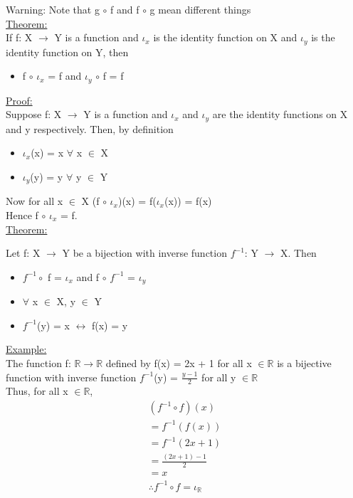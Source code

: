 \documentclass{article}
\begin{document}
Warning: Note that g $\circ$ f and f $\circ$ g mean different things \\

\underline{Theorem:} \\
If f: X $\longrightarrow$ Y is a function and $\iota_{x}$ is the identity function on X and $\iota_{y}$ is the identity function on Y, then
\begin{itemize}
\item f $\circ$ $\iota_{x}$ = f and $\iota_{y}$ $\circ$ f = f
\end{itemize}

\underline{Proof:} \\
Suppose f: X $\longrightarrow$ Y is a function and $\iota_{x}$ and $\iota_{y}$ are the identity functions on X and y respectively. Then, by definition
\begin{itemize}
\item $\iota_{x}$(x) = x $\forall$ x $\in$ X
\item $\iota_{y}$(y) = y $\forall$ y $\in$ Y
\end{itemize}

Now for all x $\in$ X (f $\circ$ $\iota_{x}$)(x) = f($\iota_{x}$(x)) = f(x) \\
Hence f $\circ$ $\iota_{x}$ = f. \\

\underline{Theorem:}

Let f: X $\longrightarrow$ Y be a bijection with inverse function $f^{-1}$: Y $\longrightarrow$ X. Then 
\begin{itemize}
\item $f^{-1} \circ$ f = $\iota_{x}$ and f $\circ$ $f^{-1}$ = $\iota_{y}$
\item $\forall$ x $\in$ X, y $\in$ Y
\item $f^{-1}$(y) = x $\leftrightarrow$ f(x) = y
\end{itemize} 

\underline{Example:} \\

The function f: $\mathbb{R} \longrightarrow \mathbb{R}$ defined by f(x) = 2x + 1 for all x $\in \mathbb{R}$ is a bijective function with inverse function $f^{-1}$(y) = $\frac{y-1}{2}$ for all y $\in \mathbb{R}$ \\

Thus, for all x $\in \mathbb{R}$, \\

\begin{align}
(f^{-1} \circ f)(x) \\
= f^{-1}(f(x)) \\
= f^{-1}(2x + 1)\\
= \frac{(2x+1)-1}{2} \\
= x \\
\therefore f^{-1} \circ f = \iota_{\mathbb{R}}
\end{align}
\end{document}
